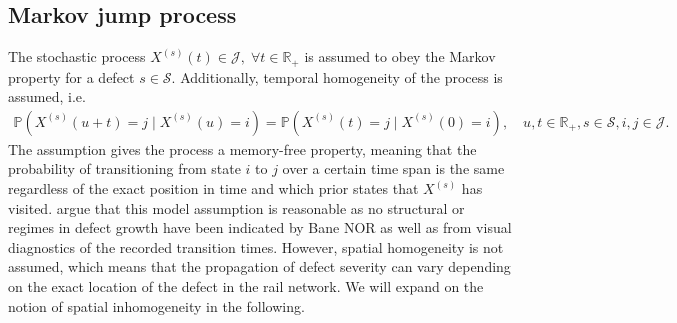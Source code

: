 \documentclass{article}
\begin{document}
\subsection{Markov jump process} \label{sec:mjp}
The stochastic process $X^{(s)}(t) \in \mathcal{J}, \; \forall t \in \mathbb R_+$ is assumed to obey the Markov property for a defect $s \in \mathcal S$. Additionally, temporal homogeneity of the process is assumed, i.e.
\begin{align}
    \mathds{P} \left(X^{(s)}(u+t) = j \mid X^{(s)}(u) = i \right) =  \mathds{P} \left( X^{(s)}(t) = j \mid X^{(s)}(0) = i \right), \quad u,t\in \mathbb R_+, s \in \mathcal S, i,j \in \mathcal{J}. \label{eq:markov_property}
\end{align}
The assumption gives the process a memory-free property, meaning that the probability of transitioning from state $i$ to $j$ over a certain time span is the same regardless of the exact position in time and which prior states that $X^{(s)}$ has visited. \citet{bisgaard2024A} argue that this model assumption is reasonable as no structural or regimes in defect growth have been indicated by Bane NOR as well as from visual diagnostics of the recorded transition times.
However, spatial homogeneity is not assumed, which means that the propagation of defect severity can vary depending on the exact location of the defect in the rail network. We will expand on the notion of spatial inhomogeneity in the following.
\end{document}

